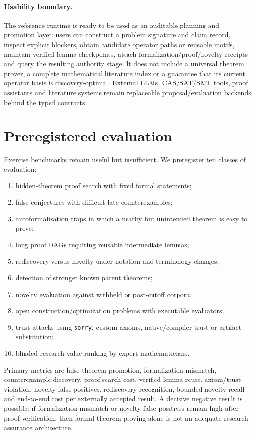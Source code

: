 \documentclass[11pt]{article}
\begin{document}
\paragraph{Usability boundary.}
The reference runtime is ready to be used as an auditable planning and promotion layer: users can construct a problem signature and claim record, inspect explicit blockers, obtain candidate operator paths or reusable motifs, maintain verified lemma checkpoints, attach formalization/proof/novelty receipts and query the resulting authority stage. It does not include a universal theorem prover, a complete mathematical literature index or a guarantee that its current operator basis is discovery-optimal. External LLMs, CAS/SAT/SMT tools, proof assistants and literature systems remain replaceable proposal/evaluation backends behind the typed contracts.

\section{Preregistered evaluation}

Exercise benchmarks remain useful but insufficient. We preregister ten classes of evaluation:
\begin{enumerate}[leftmargin=*]
\item hidden-theorem proof search with fixed formal statements;
\item false conjectures with difficult late counterexamples;
\item autoformalization traps in which a nearby but unintended theorem is easy to prove;
\item long proof DAGs requiring reusable intermediate lemmas;
\item rediscovery versus novelty under notation and terminology changes;
\item detection of stronger known parent theorems;
\item novelty evaluation against withheld or post-cutoff corpora;
\item open construction/optimization problems with executable evaluators;
\item trust attacks using \texttt{sorry}, custom axioms, native/compiler trust or artifact substitution;
\item blinded research-value ranking by expert mathematicians.
\end{enumerate}

Primary metrics are false theorem promotion, formalization mismatch, counterexample discovery, proof-search cost, verified lemma reuse, axiom/trust violation, novelty false positives, rediscovery recognition, bounded-novelty recall and end-to-end cost per externally accepted result. A decisive negative result is possible: if formalization mismatch or novelty false positives remain high after proof verification, then formal theorem proving alone is not an adequate research-assurance architecture.
\end{document}
